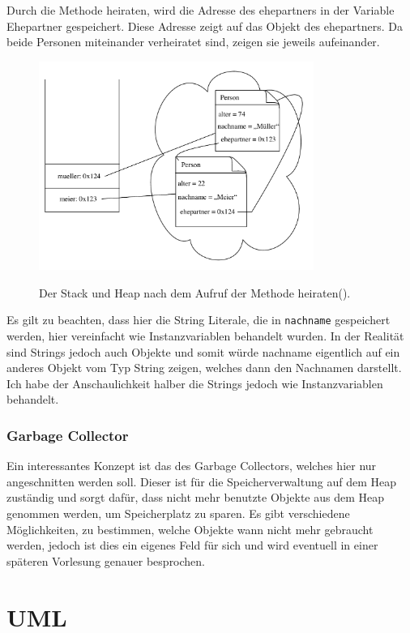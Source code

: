 Durch die Methode heiraten, wird die Adresse des ehepartners in der Variable Ehepartner gespeichert. Diese Adresse zeigt auf das Objekt des ehepartners. Da beide Personen miteinander verheiratet sind, zeigen sie jeweils aufeinander.

\begin{figure}[htbp!] 
\centering    
\includegraphics[width=0.8\textwidth]{stackheap_2}
\label{fig:stackheap2}
\caption{Der Stack und Heap nach dem Aufruf der Methode heiraten().}
\end{figure}

Es gilt zu beachten, dass hier die String Literale, die in \texttt{nachname} gespeichert werden, hier vereinfacht wie Instanzvariablen behandelt wurden. In der Realität sind Strings jedoch auch Objekte und somit würde nachname eigentlich auf ein anderes Objekt vom Typ String zeigen, welches dann den Nachnamen darstellt. Ich habe der Anschaulichkeit halber die Strings jedoch wie Instanzvariablen behandelt.

\subsubsection{Garbage Collector}
Ein interessantes Konzept ist das des Garbage Collectors, welches hier nur angeschnitten werden soll. Dieser ist für die Speicherverwaltung auf dem Heap zuständig und sorgt dafür, dass nicht mehr benutzte Objekte aus dem Heap genommen werden, um Speicherplatz zu sparen. Es gibt verschiedene Möglichkeiten, zu bestimmen, welche Objekte wann nicht mehr gebraucht werden, jedoch ist dies ein eigenes Feld für sich und wird eventuell in einer späteren Vorlesung genauer besprochen.

\section{UML}

